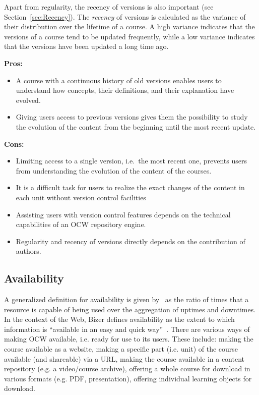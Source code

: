 \documentclass{sig-alternate}
\theoremstyle{definition}
\begin{document}
Apart from regularity, the recency of versions is also important (see Section~\ref{sec:Recency}).
The \emph{recency} of versions is calculated as the variance of their distribution over the lifetime of a course.
A high variance indicates that the versions of a course tend to be updated frequently, while a low variance indicates that the versions have been updated a long time ago.

\noindent\textbf{Pros:}
\begin{itemize}
\item A course with a continuous history of old versions enables users to understand how concepts, their definitions, and their explanation have evolved.
\item Giving users access to previous versions gives them the possibility to study the evolution of the content from the beginning until the most recent update.
\end{itemize}
\noindent\textbf{Cons:}
\begin{itemize}
\item Limiting access to a single version, i.e.\ the most recent one, prevents users from understanding the evolution of the content of the courses.
\item It is a difficult task for users to realize the exact changes of the content in each unit without version control facilities
\item Assisting users with version control features depends on the technical capabilities of an OCW repository engine.
\item Regularity and recency of versions directly depends on the contribution of authors.
\end{itemize}

\subsection{Availability}
\label{sec:Availability}
A generalized definition for availability is given by~\parencite{Katukoori.1995} as the ratio of times that a resource is capable of being used over the aggregation of uptimes and downtimes.
In the context of the Web, Bizer defines availability as the extent to which information is ``available in an easy and quick way''~\parencite{Bizer2008:PhDThesis:biblatex}.
There are various ways of making OCW available, i.e. ready for use to its users.
These include: making the course available as a website, 
making a specific part (i.e. unit) of the course available (and shareable) via a URL,
making the course available in a content repository (e.g. a video/course archive),
offering a whole course for download in various formats (e.g. PDF, presentation),
offering individual learning objects for download.
\end{document}
